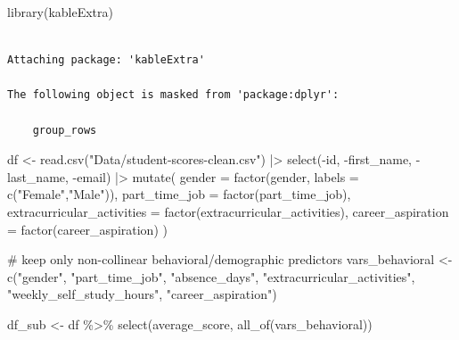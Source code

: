 \documentclass[
  letterpaper,
  DIV=11,
  numbers=noendperiod]{scrartcl}
\newenvironment{Shaded}{\begin{snugshade}}{\end{snugshade}}
\newcommand{\AttributeTok}[1]{\textcolor[rgb]{0.40,0.45,0.13}{#1}}
\newcommand{\CommentTok}[1]{\textcolor[rgb]{0.37,0.37,0.37}{#1}}
\newcommand{\FunctionTok}[1]{\textcolor[rgb]{0.28,0.35,0.67}{#1}}
\newcommand{\NormalTok}[1]{\textcolor[rgb]{0.00,0.23,0.31}{#1}}
\newcommand{\OtherTok}[1]{\textcolor[rgb]{0.00,0.23,0.31}{#1}}
\newcommand{\SpecialCharTok}[1]{\textcolor[rgb]{0.37,0.37,0.37}{#1}}
\newcommand{\StringTok}[1]{\textcolor[rgb]{0.13,0.47,0.30}{#1}}
\begin{document}
\begin{Shaded}
\begin{Highlighting}[]
\FunctionTok{library}\NormalTok{(kableExtra)}
\end{Highlighting}
\end{Shaded}

\begin{verbatim}

Attaching package: 'kableExtra'

The following object is masked from 'package:dplyr':

    group_rows
\end{verbatim}

\begin{Shaded}
\begin{Highlighting}[]
\NormalTok{df }\OtherTok{\textless{}{-}} \FunctionTok{read.csv}\NormalTok{(}\StringTok{"Data/student{-}scores{-}clean.csv"}\NormalTok{) }\SpecialCharTok{|\textgreater{}}
  \FunctionTok{select}\NormalTok{(}\SpecialCharTok{{-}}\NormalTok{id, }\SpecialCharTok{{-}}\NormalTok{first\_name, }\SpecialCharTok{{-}}\NormalTok{last\_name, }\SpecialCharTok{{-}}\NormalTok{email) }\SpecialCharTok{|\textgreater{}}
  \FunctionTok{mutate}\NormalTok{(}
    \AttributeTok{gender                  =} \FunctionTok{factor}\NormalTok{(gender, }\AttributeTok{labels =} \FunctionTok{c}\NormalTok{(}\StringTok{"Female"}\NormalTok{,}\StringTok{"Male"}\NormalTok{)),}
    \AttributeTok{part\_time\_job           =} \FunctionTok{factor}\NormalTok{(part\_time\_job),}
    \AttributeTok{extracurricular\_activities =} \FunctionTok{factor}\NormalTok{(extracurricular\_activities),}
    \AttributeTok{career\_aspiration       =} \FunctionTok{factor}\NormalTok{(career\_aspiration)}
\NormalTok{  )}

\CommentTok{\# keep only non{-}collinear behavioral/demographic predictors}
\NormalTok{vars\_behavioral }\OtherTok{\textless{}{-}} \FunctionTok{c}\NormalTok{(}\StringTok{"gender"}\NormalTok{, }\StringTok{"part\_time\_job"}\NormalTok{, }
                     \StringTok{"absence\_days"}\NormalTok{, }\StringTok{"extracurricular\_activities"}\NormalTok{, }
                     \StringTok{"weekly\_self\_study\_hours"}\NormalTok{, }\StringTok{"career\_aspiration"}\NormalTok{)}

\NormalTok{df\_sub }\OtherTok{\textless{}{-}}\NormalTok{ df }\SpecialCharTok{\%\textgreater{}\%} \FunctionTok{select}\NormalTok{(average\_score, }\FunctionTok{all\_of}\NormalTok{(vars\_behavioral))}
\end{Highlighting}
\end{Shaded}
\end{document}
